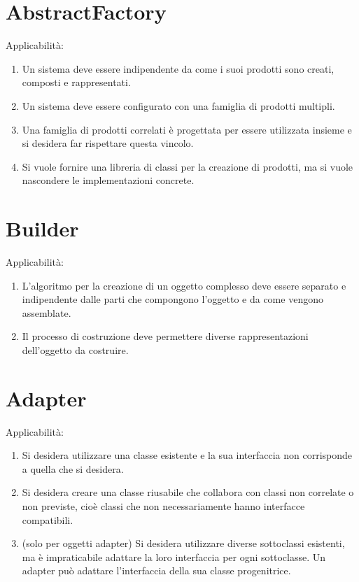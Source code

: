 \documentclass[12pt]{article}
\begin{document}
\copertina
\tableofcontents
\newpage

\section{AbstractFactory}

Applicabilità:
\begin{enumerate}
	\item Un sistema deve essere indipendente da come i suoi prodotti sono
	      creati, composti e rappresentati.

	\item Un sistema deve essere configurato con una famiglia di prodotti
	      multipli.

	\item Una famiglia di prodotti correlati è progettata per essere utilizzata
	      insieme e si desidera far rispettare questa vincolo.

	\item Si vuole fornire una libreria di classi per la creazione di prodotti,
	      ma si vuole nascondere le implementazioni concrete.
\end{enumerate}

\section{Builder}

Applicabilità:
\begin{enumerate}
	\item L'algoritmo per la creazione di un oggetto complesso deve essere
	      separato e indipendente dalle parti che compongono l'oggetto e da come
	      vengono assemblate.

	\item Il processo di costruzione deve permettere diverse rappresentazioni
	      dell'oggetto da costruire.
\end{enumerate}

\section{Adapter}

Applicabilità:
\begin{enumerate}
	\item Si desidera utilizzare una classe esistente e la sua interfaccia non
	      corrisponde a quella che si desidera.

	\item Si desidera creare una classe riusabile che collabora con classi non
	      correlate o non previste, cioè classi che non necessariamente hanno
	      interfacce compatibili.

	\item (solo per oggetti adapter) Si desidera utilizzare diverse sottoclassi
	      esistenti, ma è impraticabile adattare la loro interfaccia per ogni
	      sottoclasse. Un adapter può adattare l'interfaccia della sua classe
	      progenitrice.
\end{enumerate}
\end{document}
